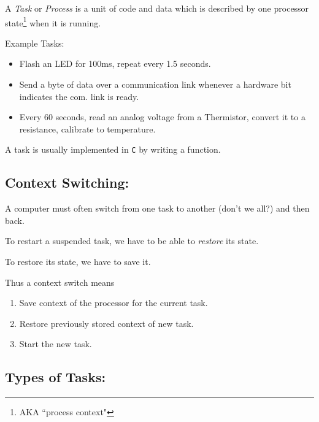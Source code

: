 A {\it Task} or {\it Process} is a unit of code and data which is
described by one processor state\footnote{AKA ``process context"}  when it is running. 

Example Tasks:
\begin{itemize}
    \item Flash an LED for 100ms, repeat every 1.5 seconds.
    \item Send a byte of data over a communication link whenever a hardware bit indicates
    the com. link is ready. 
    \item Every 60 seconds, read an analog voltage from a Thermistor, convert it to a resistance, calibrate to temperature. 
\end{itemize}

A task is usually implemented in {\tt C} by writing a function.

\subsection{Context Switching:}

A computer must often switch from one task to another (don't we all?) and then back.

To restart a suspended task, we have to be able to {\it restore} its state. 

To restore its state, we have to save it.  

Thus a context switch means
\begin{enumerate}
  \item Save context of the processor for the current task.
  \item Restore previously stored context of new task.
  \item Start the new task.
\end{enumerate}


\subsection{Types of Tasks:}

